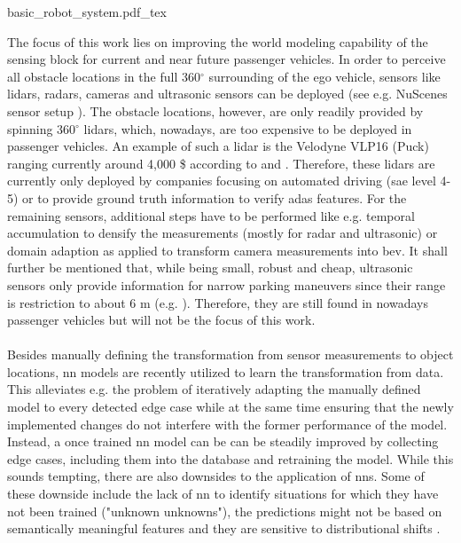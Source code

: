 \begin{center}
	{basic_robot_system.pdf_tex}
\end{center}
The focus of this work lies on improving the world modeling capability of the sensing block for current and near future passenger vehicles. In order to perceive all obstacle locations in the full 360$^{\circ}$ surrounding of the ego vehicle, sensors like lidars, radars, cameras and ultrasonic sensors can be deployed (see e.g. NuScenes sensor setup \cite{caesar2020nuscenes}). The obstacle locations, however, are only readily provided by spinning 360$^{\circ}$ lidars, which, nowadays, are too expensive to be deployed in passenger vehicles. An example of such a lidar is the Velodyne VLP16 (Puck) ranging currently around 4,000 \$ according to \cite{cnet2018} and \cite{velodyne2018}. Therefore, these lidars are currently only deployed by companies focusing on automated driving (\gls{sae} level 4-5) or to provide ground truth information to verify \gls{adas} features. For the remaining sensors, additional steps have to be performed like e.g. temporal accumulation to densify the measurements (mostly for radar and ultrasonic) or domain adaption as applied to transform camera measurements into \gls{bev}. It shall further be mentioned that, while being small, robust and cheap, ultrasonic sensors only provide information for narrow parking maneuvers since their range is restriction to about 6 m (e.g. \cite{boschultrasonic2022}). Therefore, they are still found in nowadays passenger vehicles but will not be the focus of this work.
\\\\
Besides manually defining the transformation from sensor measurements to object locations, \gls{nn} models are recently utilized to learn the transformation from data. This alleviates e.g. the problem of iteratively adapting the manually defined model to every detected edge case while at the same time ensuring that the newly implemented changes do not interfere with the former performance of the model. Instead, a once trained \gls{nn} model can be can be steadily improved by collecting edge cases, including them into the database and retraining the model. While this sounds tempting, there are also downsides to the application of \gls{nn}s. Some of these downside include the lack of \gls{nn} to identify situations for which they have not been trained ("unknown unknowns"), the predictions might not be based on semantically meaningful features and they are sensitive to distributional shifts \cite{safetyfirst2019}.
